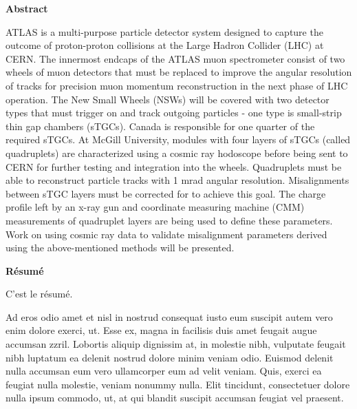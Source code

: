 \renewcommand\contentsname{Table of Contents}
\tableofcontents
\cleardoublepage
{}    %


\begin{center}\textbf{Abstract}\end{center}


ATLAS is a multi-purpose particle detector system designed to capture the outcome of proton-proton collisions at the Large Hadron Collider (LHC) at CERN. The innermost endcaps of the ATLAS muon spectrometer consist of two wheels of muon detectors that must be replaced to improve the angular resolution of tracks for precision muon momentum reconstruction in the next phase of LHC operation. The New Small Wheels (NSWs) will be covered with two detector types that must trigger on and track outgoing particles - one type is small-strip thin gap chambers (sTGCs). Canada is responsible for one quarter of the required sTGCs. At McGill University, modules with four layers of sTGCs (called quadruplets) are characterized using a cosmic ray hodoscope before being sent to CERN for further testing and integration into the wheels. Quadruplets must be able to reconstruct particle tracks with 1 mrad angular resolution. Misalignments between sTGC layers must be corrected for to achieve this goal. The charge profile left by an x-ray gun and coordinate measuring machine (CMM) measurements of quadruplet layers are being used to define these parameters. Work on using cosmic ray data to validate misalignment parameters derived using the above-mentioned methods will be presented.

\cleardoublepage


\begin{center}\textbf{R\'{e}sum\'{e}}\end{center}

C'est le r\'{e}sum\'{e}.

Ad eros odio amet et nisl in nostrud consequat iusto eum suscipit autem vero enim dolore exerci, ut. Esse ex, magna in facilisis duis amet feugait augue accumsan zzril. Lobortis aliquip dignissim at, in molestie nibh, vulputate feugait nibh luptatum ea delenit nostrud dolore minim veniam odio. Euismod delenit nulla accumsan eum vero ullamcorper eum ad velit veniam. Quis, exerci ea feugiat nulla molestie, veniam nonummy nulla. Elit tincidunt, consectetuer dolore nulla ipsum commodo, ut, at qui blandit suscipit accumsan feugiat vel praesent.

